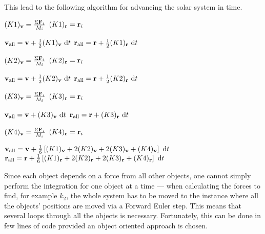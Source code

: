 This lead to the following algorithm for advancing the solar system
in time.
\begin{algorithmic}
            \State $(K1)_{\mathbf{v}} = \frac{\Sigma \mathbf{F}_i}{M_i}$
            \State $(K1)_{\mathbf{r}} = \mathbf{r}_i$
        \EndFor

        \State $\mathbf{v}_{\text{all}} = \mathbf{v} + \frac{1}{2}(K1)_{\mathbf{v}} \ \mathrm{d}t$
        \State $\mathbf{r}_{\text{all}} = \mathbf{r} + \frac{1}{2}(K1)_{\mathbf{r}} \ \mathrm{d}t$

            \State $(K2)_{\mathbf{v}} = \frac{\Sigma \mathbf{F}_i}{M_i}$
            \State $(K2)_{\mathbf{r}} = \mathbf{r}_i$
        \EndFor

        \State $\mathbf{v}_{\text{all}} = \mathbf{v} + \frac{1}{2}(K2)_{\mathbf{v}} \ \mathrm{d}t$
        \State $\mathbf{r}_{\text{all}} = \mathbf{r} + \frac{1}{2}(K2)_{\mathbf{r}} \ \mathrm{d}t$

            \State $(K3)_{\mathbf{v}} = \frac{\Sigma \mathbf{F}_i}{M_i}$
            \State $(K3)_{\mathbf{r}} = \mathbf{r}_i$
        \EndFor

        \State $\mathbf{v}_{\text{all}} = \mathbf{v} + (K3)_{\mathbf{v}} \ \mathrm{d}t$
        \State $\mathbf{r}_{\text{all}} = \mathbf{r} + (K3)_{\mathbf{r}} \ \mathrm{d}t$

            \State $(K4)_{\mathbf{v}} = \frac{\Sigma \mathbf{F}_i}{M_i}$
            \State $(K4)_{\mathbf{r}} = \mathbf{r}_i$
        \EndFor

        \State $\mathbf{v}_{\text{all}} = \mathbf{v} + \frac{1}{6}\left[ (K1)_{\mathbf{v}}
            + 2(K2)_{\mathbf{v}} + 2(K3)_{\mathbf{v}} + (K4)_{\mathbf{v}} \right] \ \mathrm{d}t$
        \State $\mathbf{r}_{\text{all}} = \mathbf{r} + \frac{1}{6}\left[ (K1)_{\mathbf{r}}
            + 2(K2)_{\mathbf{r}} + 2(K3)_{\mathbf{r}} + (K4)_{\mathbf{r}} \right] \ \mathrm{d}t$
    \EndFor
\end{algorithmic}
Since each object depends on a force from all other objects, one
cannot simply perform the integration for one object at a time ---
when calculating the forces to find, for example $k_2$, the whole
system has to be moved to the instance where all the objects'
positions are moved via a Forward Euler step. This means that
several loops through all the objects is necessary. Fortunately,
this can be done in few lines of code provided an object oriented
approach is chosen.
